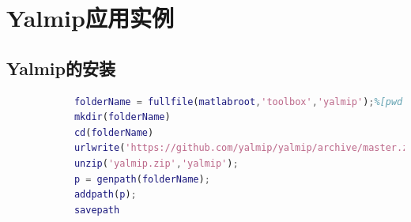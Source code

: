     \section{Yalmip应用实例}
        \subsection{Yalmip的安装}
            \begin{lstlisting}[language = Matlab]
            %% Installation YALMIP
            folderName = fullfile(matlabroot,'toolbox','yalmip');%[pwd filesep 'yalmip']
            mkdir(folderName)
            cd(folderName)
            urlwrite('https://github.com/yalmip/yalmip/archive/master.zip','yalmip.zip');
            unzip('yalmip.zip','yalmip');
            p = genpath(folderName);
            addpath(p);
            savepath
            \end{lstlisting}
